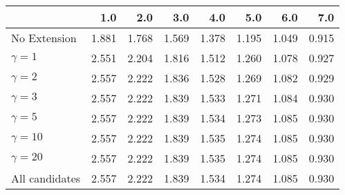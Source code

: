 \begin{tabular}{lrrrrrrr}
\toprule
{} &   1.0 &   2.0 &   3.0 &   4.0 &   5.0 &   6.0 &   7.0 \\
\midrule
No Extension   & 1.881 & 1.768 & 1.569 & 1.378 & 1.195 & 1.049 & 0.915 \\
$\gamma = 1$   & 2.551 & 2.204 & 1.816 & 1.512 & 1.260 & 1.078 & 0.927 \\
$\gamma = 2$   & 2.557 & 2.222 & 1.836 & 1.528 & 1.269 & 1.082 & 0.929 \\
$\gamma = 3$   & 2.557 & 2.222 & 1.839 & 1.533 & 1.271 & 1.084 & 0.930 \\
$\gamma = 5$   & 2.557 & 2.222 & 1.839 & 1.534 & 1.273 & 1.085 & 0.930 \\
$\gamma = 10$  & 2.557 & 2.222 & 1.839 & 1.535 & 1.274 & 1.085 & 0.930 \\
$\gamma = 20$  & 2.557 & 2.222 & 1.839 & 1.535 & 1.274 & 1.085 & 0.930 \\
All candidates & 2.557 & 2.222 & 1.839 & 1.534 & 1.274 & 1.085 & 0.930 \\
\bottomrule
\end{tabular}
